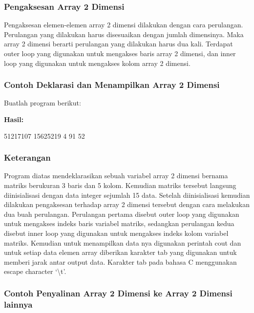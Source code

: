 \subsubsection{Pengaksesan Array 2 Dimensi}\label{pengaksesan-array-2-dimensi}

Pengaksesan elemen-elemen array 2 dimensi dilakukan dengan cara
perulangan. Perulangan yang dilakukan harus disesuaikan dengan jumlah
dimensinya. Maka array 2 dimensi berarti perulangan yang dilakukan harus
dua kali. Terdapat outer loop yang digunakan untuk mengakses baris array
2 dimensi, dan inner loop yang digunakan untuk mengakses kolom array 2
dimensi.

\subsubsection*{Contoh Deklarasi dan Menampilkan Array 2 Dimensi}

Buatlah program berikut:



\textbf{Hasil:}

\begin{lcverbatim}
51217107
15625219
4 91 52
\end{lcverbatim}


\subsubsection*{Keterangan}

Program diatas mendeklarasikan sebuah variabel array 2 dimensi bernama
matriks berukuran 3 baris dan 5 kolom. Kemudian matriks tersebut
langsung diinisialisasi dengan data integer sejumlah 15 data. Setelah
diinisialisasi kemudian dilakukan pengaksesan terhadap array 2 dimensi
tersebut dengan cara melakukan dua buah perulangan. Perulangan pertama
disebut outer loop yang digunakan untuk mengakses indeks baris variabel
matriks, sedangkan perulangan kedua disebut inner loop yang digunakan
untuk mengakses indeks kolom variabel matriks. Kemudian untuk
menampilkan data nya digunakan perintah cout dan untuk setiap data
elemen array diberikan karakter tab yang digunakan untuk memberi jarak
antar output data. Karakter tab pada bahasa C menggunakan escape
character `\textbackslash{}t'.

\subsubsection*{Contoh Penyalinan Array 2 Dimensi ke Array 2 Dimensi lainnya}

